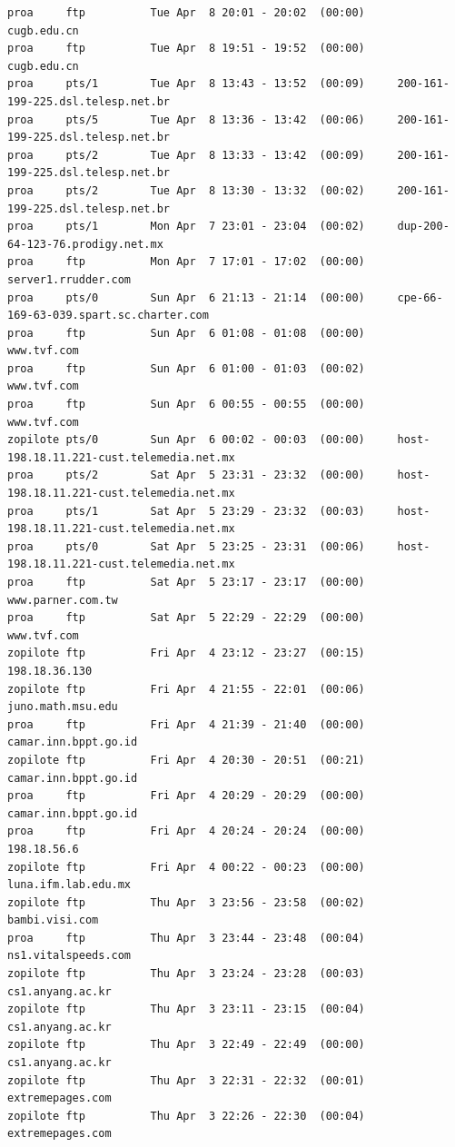 \begin{lstlisting}[style=terminal]
proa     ftp          Tue Apr  8 20:01 - 20:02  (00:00)     cugb.edu.cn
proa     ftp          Tue Apr  8 19:51 - 19:52  (00:00)     cugb.edu.cn
proa     pts/1        Tue Apr  8 13:43 - 13:52  (00:09)     200-161-199-225.dsl.telesp.net.br
proa     pts/5        Tue Apr  8 13:36 - 13:42  (00:06)     200-161-199-225.dsl.telesp.net.br
proa     pts/2        Tue Apr  8 13:33 - 13:42  (00:09)     200-161-199-225.dsl.telesp.net.br
proa     pts/2        Tue Apr  8 13:30 - 13:32  (00:02)     200-161-199-225.dsl.telesp.net.br
proa     pts/1        Mon Apr  7 23:01 - 23:04  (00:02)     dup-200-64-123-76.prodigy.net.mx
proa     ftp          Mon Apr  7 17:01 - 17:02  (00:00)     server1.rrudder.com
proa     pts/0        Sun Apr  6 21:13 - 21:14  (00:00)     cpe-66-169-63-039.spart.sc.charter.com
proa     ftp          Sun Apr  6 01:08 - 01:08  (00:00)     www.tvf.com
proa     ftp          Sun Apr  6 01:00 - 01:03  (00:02)     www.tvf.com
proa     ftp          Sun Apr  6 00:55 - 00:55  (00:00)     www.tvf.com
zopilote pts/0        Sun Apr  6 00:02 - 00:03  (00:00)     host-198.18.11.221-cust.telemedia.net.mx
proa     pts/2        Sat Apr  5 23:31 - 23:32  (00:00)     host-198.18.11.221-cust.telemedia.net.mx
proa     pts/1        Sat Apr  5 23:29 - 23:32  (00:03)     host-198.18.11.221-cust.telemedia.net.mx
proa     pts/0        Sat Apr  5 23:25 - 23:31  (00:06)     host-198.18.11.221-cust.telemedia.net.mx
proa     ftp          Sat Apr  5 23:17 - 23:17  (00:00)     www.parner.com.tw
proa     ftp          Sat Apr  5 22:29 - 22:29  (00:00)     www.tvf.com
zopilote ftp          Fri Apr  4 23:12 - 23:27  (00:15)     198.18.36.130
zopilote ftp          Fri Apr  4 21:55 - 22:01  (00:06)     juno.math.msu.edu
proa     ftp          Fri Apr  4 21:39 - 21:40  (00:00)     camar.inn.bppt.go.id
zopilote ftp          Fri Apr  4 20:30 - 20:51  (00:21)     camar.inn.bppt.go.id
proa     ftp          Fri Apr  4 20:29 - 20:29  (00:00)     camar.inn.bppt.go.id
proa     ftp          Fri Apr  4 20:24 - 20:24  (00:00)     198.18.56.6
zopilote ftp          Fri Apr  4 00:22 - 00:23  (00:00)     luna.ifm.lab.edu.mx
zopilote ftp          Thu Apr  3 23:56 - 23:58  (00:02)     bambi.visi.com
proa     ftp          Thu Apr  3 23:44 - 23:48  (00:04)     ns1.vitalspeeds.com
zopilote ftp          Thu Apr  3 23:24 - 23:28  (00:03)     cs1.anyang.ac.kr
zopilote ftp          Thu Apr  3 23:11 - 23:15  (00:04)     cs1.anyang.ac.kr
zopilote ftp          Thu Apr  3 22:49 - 22:49  (00:00)     cs1.anyang.ac.kr
zopilote ftp          Thu Apr  3 22:31 - 22:32  (00:01)     extremepages.com
zopilote ftp          Thu Apr  3 22:26 - 22:30  (00:04)     extremepages.com

\end{lstlisting}
